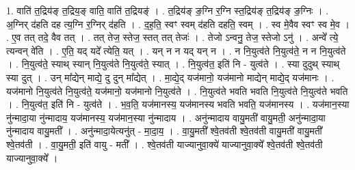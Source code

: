 \documentclass[17pt]{extarticle}
\begin{document}
1. वाति॑ त॒द्रिय॑ङ् त॒द्रिय॒ङ् वाति॒ वाति॑ त॒द्रियङ्॑ । . त॒द्रिय॑ङ् ङ॒ग्नि र॒ग्नि स्त॒द्रिय॑ङ् त॒द्रिय॑ङ् ङ॒ग्निः । . अ॒ग्निर् द॑हति दह त्य॒ग्नि र॒ग्निर् द॑हति । . द॒ह॒ति॒ स्वꣳ स्वम् द॑हति दहति॒ स्वम् । . स्व मे॒वैव स्वꣳ स्व मे॒व । . ए॒व तत् तदे॒ वैव तत् । . तत् तेज॒ स्तेज॒ स्तत् तत् तेजः॑ । . तेजो ऽन्वनु॒ तेज॒ स्तेजो ऽनु॑ । . अन्वे᳚ त्ये॒ त्यन्वन् वे॑ति । . ए॒ति॒ यद् यदे᳚ त्येति॒ यत् । . यन् न न यद् यन् न । . न नि॒युत्व॑ते नि॒युत्व॑ते॒ न न नि॒युत्व॑ते । . नि॒युत्व॑ते॒ स्याथ् स्यान् नि॒युत्व॑ते नि॒युत्व॑ते॒ स्यात् । . नि॒युत्व॑त॒ इति॑ नि - युत्व॑ते । . स्या दुदुथ् स्याथ् स्या दुत् । . उन् मा᳚द्येन् माद्ये॒ दु दुन् मा᳚द्येत् । . मा॒द्ये॒द् यज॑मानो॒ यज॑मानो माद्येन् माद्ये॒द् यज॑मानः । . यज॑मानो नि॒युत्व॑ते नि॒युत्व॑ते॒ यज॑मानो॒ यज॑मानो नि॒युत्व॑ते । . नि॒युत्व॑ते भवति भवति नि॒युत्व॑ते नि॒युत्व॑ते भवति । . नि॒युत्व॑त॒ इति॑ नि - युत्व॑ते । . भ॒व॒ति॒ यज॑मानस्य॒ यज॑मानस्य भवति भवति॒ यज॑मानस्य । . यज॑मान॒स्या नु॑न्मादा॒या नु॑न्मादाय॒ यज॑मानस्य॒ यज॑मान॒स्या नु॑न्मादाय । . अनु॑न्मादाय वायु॒मती॑ वायु॒मती॒ अनु॑न्मादा॒या नु॑न्मादाय वायु॒मती᳚ । . अनु॑न्मादा॒येत्यनु॑त् - मा॒दा॒य॒ । . वा॒यु॒मती᳚ श्वे॒तव॑ती श्वे॒तव॑ती वायु॒मती॑ वायु॒मती᳚ श्वे॒तव॑ती । . वा॒यु॒मती॒ इति॑ वायु - मती᳚ । . श्वे॒तव॑ती याज्यानुवा॒क्ये॑ याज्यानुवा॒क्ये᳚ श्वे॒तव॑ती श्वे॒तव॑ती याज्यानुवा॒क्ये᳚ । \newline
\end{document}
